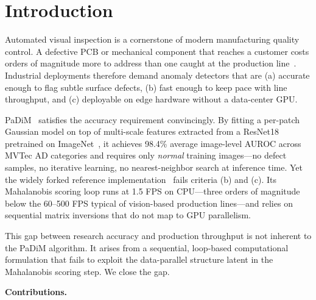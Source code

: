 \documentclass[blind]{gtac}
\begin{document}
\section{Introduction}
\label{sec:intro}

Automated visual inspection is a cornerstone of modern manufacturing quality
control.  A defective PCB or mechanical component that reaches a customer costs
orders of magnitude more to address than one caught at the production
line~\cite{bergmann2019mvtec}.  Industrial deployments therefore demand anomaly
detectors that are (a) accurate enough to flag subtle surface defects, (b) fast
enough to keep pace with line throughput, and (c) deployable on edge hardware
without a data-center GPU.

PaDiM~\cite{defard2021padim} satisfies the accuracy requirement convincingly.
By fitting a per-patch Gaussian model on top of multi-scale features extracted
from a ResNet18~\cite{he2016deep} pretrained on ImageNet~\cite{deng2009imagenet},
it achieves 98.4\% average
image-level AUROC across MVTec AD categories and requires only \emph{normal}
training images---no defect samples, no iterative learning, no nearest-neighbor
search at inference time.  Yet the widely forked reference
implementation~\cite{padim_repo} fails criteria (b) and (c).  Its Mahalanobis
scoring loop runs at 1.5 FPS on CPU---three orders of magnitude below the
60--500 FPS typical of vision-based production lines---and relies on sequential
matrix inversions that do not map to GPU parallelism.

This gap between research accuracy and production throughput is not inherent to
the PaDiM algorithm.  It arises from a sequential, loop-based computational
formulation that fails to exploit the data-parallel structure latent in the
Mahalanobis scoring step.  We close the gap.

\textbf{Contributions.}
\end{document}
